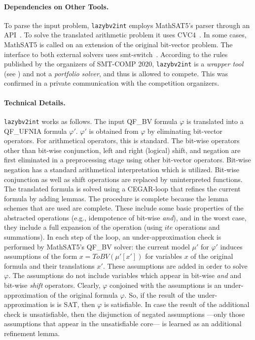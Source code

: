 \documentclass{easychair}
\newcommand{\lazybvtoint}{\texttt{lazybv2int}\xspace}
\newcommand{\smtcomp}{SMT-COMP\xspace}
\newcommand{\qfbv}{QF\_BV\xspace}
\newcommand{\qfufnia}{QF\_UFNIA\xspace}
\newcommand{\msat}{MathSAT5\xspace}
\newcommand{\cvcfour}{CVC4\xspace}
\newcommand{\smtswitch}{smt-switch\xspace}
\begin{document}
\paragraph{Dependencies on Other Tools.}
%
To parse the input problem, \lazybvtoint employs \msat's
parser through an API~\cite{mathsat5}.
To solve the translated arithmetic problem it uses \cvcfour~\cite{cvc4}.
In some cases, \msat is called on an extension of the original bit-vector problem.
%
The interface to both external solvers uses
\smtswitch~\cite{smtswitchgithub}.
%
According to the rules published by the organizers
of \smtcomp 2020, \lazybvtoint is a {\em wrapper tool} (see \cite{rules20})
and not a {\em portfolio solver},
and thus is allowed to compete.
This was confirmed in a private communication with the competition organizers.

\paragraph{Technical Details.}
\lazybvtoint works as follows. The input \qfbv formula $\varphi$ is translated
into a \qfufnia formula $\varphi'$. $\varphi'$ is obtained from $\varphi$ by
eliminating bit-vector operators. For arithmetical operators, this is standard.
The bit-wise operators other than bit-wise conjunction, left and right (logical)
shift, and negation are first eliminated in a preprocessing stage using other
bit-vector operators. Bit-wise negation has a standard arithmetical
interpretation which is utilized. Bit-wise conjunction as well as shift
operations are replaced by uninterpreted functions.
%
The translated formula is solved using a CEGAR-loop that refines the current
formula by adding lemmas. The procedure is complete because the lemma schemes
that are used are complete.
%
These include some basic properties of the abstracted operations (e.g.,
idempotence of bit-wise \emph{and}), and in the worst case, they include a full
expansion of the operation (using $ite$ operations and summations).
%
In each step of the loop, an under-approximation check is performed by \msat's
\qfbv solver: the current model $\mu'$ for $\varphi'$ induces assumptions
of the form $x=ToBV(\mu'[x'])$ for variables $x$ of the original formula
and their translations $x'$. 
These assumptions are added in order to solve $\varphi$.
The assumptions do not
include variables which appear in bit-wise \emph{and} and bit-wise \emph{shift} 
operators.
Clearly, $\varphi$ conjoined with the assumptions is an under-approximation of
the original formula $\varphi$. So, if the result of the under-approximation is
is SAT, then $\varphi$ is satisfiable. In case the result of the additional
check is unsatisfiable, then the disjunction of negated assumptions ---only those
assumptions that appear in the unsatisfiable core--- is learned as an additional
refinement lemma.
\end{document}
